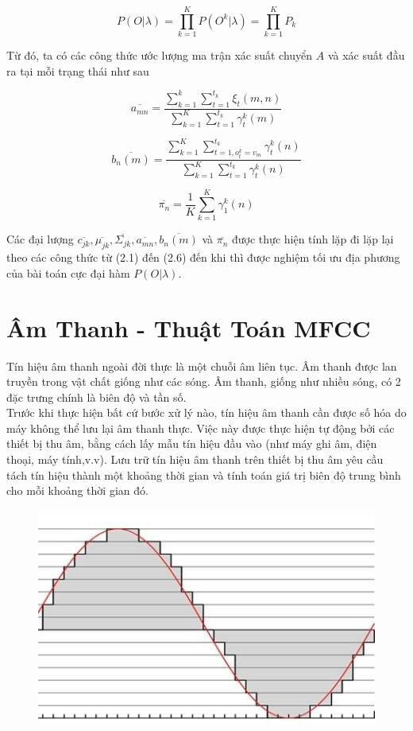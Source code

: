 \documentclass[13pt]{extreport}
\begin{document}
$$P(O | \lambda) = \prod_{k=1}^K P(O^{k} | \lambda) = \prod_{k=1}^K P_k$$

Từ đó, ta có các công thức ước lượng ma trận xác suất chuyển $A$ và xác suất đầu ra tại mỗi trạng thái như sau

\begin{equation}
\overline{a_{mn}} = \dfrac{\sum\limits_{k=1}^k \sum\limits_{t=1}^{t_k} \xi_t(m,n)}{\sum\limits_{k=1}^K \sum\limits_{t=1}^{t_k} \gamma_{t}^{k}(m)}
\end{equation}

\begin{equation}
\overline{b_n(m)} = \dfrac{\sum\limits_{k=1}^K \sum\limits_{t = 1, o_t^{k} = v_m}^{t_k} \gamma_{t}^{k}(n)}{\sum\limits_{k=1}^K \sum\limits_{t = 1}^{t_k} \gamma_{t}^{k}(n)}
\end{equation}

\begin{equation}
\overline{\pi_n} = \dfrac{1}{K} \sum_{k=1}^{K} \gamma_1^{k}(n)
\end{equation}

Các đại lượng $\overline{c_{jk}}, \overline{\mu_{jk}}, \overline{\Sigma_{jk}}, \overline{a_{mn}}, \overline{b_n(m)}$ và $\overline{\pi_n}$ được thực hiện tính lặp đi lặp lại theo các công thức từ (2.1) đến (2.6) đến khi thì được nghiệm tối ưu địa phương của bài toán cực đại hàm $P(O | \lambda)$. 
\chapter{Âm Thanh - Thuật Toán MFCC}
Tín hiệu âm thanh ngoài đời thực là một chuỗi âm liên tục. Âm thanh được lan truyền trong vật chất giống như các sóng. Âm thanh, giống như nhiều sóng, có 2 đặc trưng chính là biên độ và tần số. \\
Trước khi thực hiện bất cứ bước xử lý nào, tín hiệu âm thanh cần được số hóa do máy không thể lưu lại âm thanh thực. Việc này được thực hiện tự động bởi các thiết bị thu âm, bằng cách lấy mẫu tín hiệu đầu vào (như máy ghi âm, điện thoại, máy tính,v.v). Lưu trữ tín hiệu âm thanh trên thiết bị thu âm yêu cầu tách tín hiệu thành một khoảng thời gian và tính toán giá trị biên độ trung bình cho mỗi khoảng thời gian đó. 

\begin{figure}[H]
\begin{center}
\includegraphics[scale=0.5]{./uploads_new/Hidden_Markov_Model_1._Mo_hinh_Markov_Vi.docx_DIR/media/anh1.jpg}
\end{center}
\end{figure}
\end{document}

